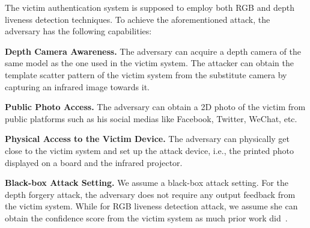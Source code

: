 The victim authentication system is supposed to employ both RGB and depth liveness detection techniques. To achieve the aforementioned attack, the adversary has the following capabilities:

\textbf{Depth Camera Awareness.}
The adversary can acquire a depth camera of the same model as the one used in the victim system. The attacker can obtain the template scatter pattern of the victim system from the substitute camera by capturing an infrared image towards it.


\textbf{Public Photo Access.}
The adversary can obtain a  2D photo of the victim from  public platforms such as his social medias like Facebook, Twitter, WeChat, etc.

\textbf{Physical Access to the Victim Device.} The adversary can physically get close to the victim system and set up the attack device, i.e., the printed photo displayed on a board and the infrared projector.


\textbf{Black-box Attack Setting.} 
We assume a black-box attack setting. For the depth forgery attack, the adversary does not require any output feedback from the victim system. While for RGB liveness detection attack, we assume she can obtain the  confidence score from the victim system as much prior work did~\cite{guo2019simple}.



